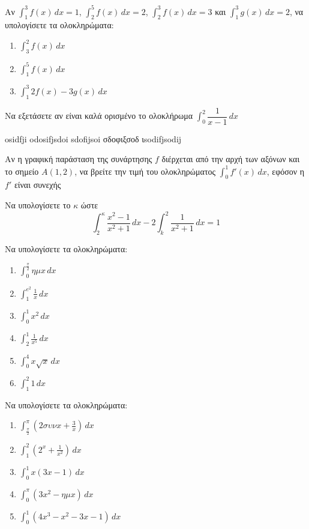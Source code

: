 \documentclass{../presentation}
\begin{document}
\begin{askisi}
  Αν $\int_{1}^{3}f(x)\,dx=1$, $\int_{2}^{5}f(x)\,dx=2$, $\int_{2}^{3}f(x)\,dx=3$ και $\int_{1}^{3}g(x)\,dx=2$, να υπολογίσετε τα ολοκληρώματα:
  \begin{enumerate}[<+->]
    \item $\int_{3}^{2}f(x)\,dx$
    \item $\int_{1}^{5}f(x)\,dx$
    \item $\int_{1}^{3}2f(x)-3g(x)\,dx$
  \end{enumerate}
\end{askisi}

\begin{askisi}
  Να εξετάσετε αν είναι καλά ορισμένο το ολοκλήρωμα $\int_{0}^{2}\dfrac{1}{x-1}\, dx$
\end{askisi}
osidfji odosifjsdoi sdofijsoi σδοφιξσοδ ιsodifjsodij
\begin{askisi}
  Αν η γραφική παράσταση της συνάρτησης $f$ διέρχεται από την αρχή των αξόνων και το σημείο $Α(1,2)$, να βρείτε την τιμή του ολοκληρώματος $\int_{0}^{1}f'(x)\,dx$, εφόσον η $f'$ είναι συνεχής
\end{askisi}

\begin{askisi}
  Να υπολογίσετε το $κ$ ώστε
  $$\int_{2}^{κ}\frac{x^2-1}{x^2+1}\, dx-2\int_{k}^{2}\frac{1}{x^2+1}\, dx=1$$
\end{askisi}

\begin{askisi}
  Να υπολογίσετε τα ολοκληρώματα:
  \begin{enumerate}[<+->]
    \item $\int_{0}^{\frac{π}{2}}ημx\,dx$
    \item $\int_{1}^{e^2}\frac{1}{x}\,dx$
    \item $\int_{0}^{1}x^2\,dx$
    \item $\int_{2}^{1}\frac{1}{x^5}\,dx$
    \item $\int_{0}^{4}x\sqrt{x}\,dx$
    \item $\int_{1}^{2}1\,dx$
  \end{enumerate}
\end{askisi}

\begin{askisi}
  Να υπολογίσετε τα ολοκληρώματα:
  \begin{enumerate}[<+->]
    \item $\int_{\frac{π}{2}}^{π}\left( 2συνx+\frac{3}{x} \right)\,dx$
    \item $\int_{1}^{2}\left( 2^x+\frac{1}{x^2} \right)\,dx$
    \item $\int_{0}^{1}x(3x-1)\,dx$
    \item $\int_{0}^{π}(3x^2-ημx)\,dx$
    \item $\int_{0}^{1}(4x^3-x^2-3x-1)\,dx$
  \end{enumerate}
\end{askisi}
\end{document}
